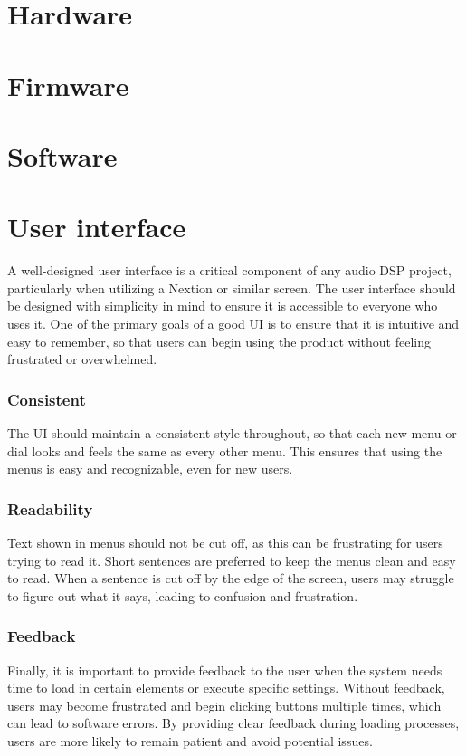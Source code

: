 \section{Hardware}

\section{Firmware}

\section{Software}

\section{User interface}

A well-designed user interface is a critical component of any audio DSP project, particularly when utilizing a Nextion or similar screen. The user interface should be designed with simplicity in mind to ensure it is accessible to everyone who uses it. One of the primary goals of a good UI is to ensure that it is intuitive and easy to remember, so that users can begin using the product without feeling frustrated or overwhelmed.

\subsubsection*{Consistent}
The UI should maintain a consistent style throughout, so that each new menu or dial looks and feels the same as every other menu. This ensures that using the menus is easy and recognizable, even for new users.

\subsubsection*{Readability}
Text shown in menus should not be cut off, as this can be frustrating for users trying to read it. Short sentences are preferred to keep the menus clean and easy to read. When a sentence is cut off by the edge of the screen, users may struggle to figure out what it says, leading to confusion and frustration.

\subsubsection*{Feedback}
Finally, it is important to provide feedback to the user when the system needs time to load in certain elements or execute specific settings. Without feedback, users may become frustrated and begin clicking buttons multiple times, which can lead to software errors. By providing clear feedback during loading processes, users are more likely to remain patient and avoid potential issues.

